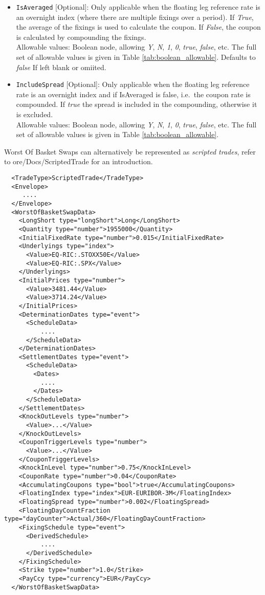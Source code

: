 \begin{itemize}
  \item \lstinline!IsAveraged! [Optional]: Only applicable when the floating leg
  reference rate is an overnight index (where there are multiple fixings over a period). If \emph{True},
  the average of the fixings is used to calculate the coupon. If \emph{False},
  the coupon is calculated by compounding the fixings. \\
    Allowable values: Boolean node, allowing \emph{Y}, \emph{N}, \emph{1}, \emph{0}, \emph{true},
    \emph{false}, etc. The full set of allowable values is given in Table \ref{tab:boolean_allowable}.
    Defaults to \emph{false} If left blank or omiited.
  \item \lstinline!IncludeSpread! [Optional]: Only applicable when the floating leg
  reference rate is an overnight index and if IsAveraged is false, i.e.\ the coupon rate is compounded.
  If \emph{true} the spread is included in the compounding, otherwise it is excluded. \\
     Allowable values:  Boolean node, allowing \emph{Y}, \emph{N}, \emph{1}, \emph{0}, \emph{true}, \emph{false}, etc.
  The full set of allowable values is given in Table \ref{tab:boolean_allowable}.
\end{itemize}

Worst Of Basket Swaps can alternatively be represented as {\em scripted trades}, refer to ore/Docs/ScriptedTrade for an introduction.

\begin{verbatim}
  <TradeType>ScriptedTrade</TradeType>
  <Envelope>
     ....
  </Envelope>
  <WorstOfBasketSwapData>
    <LongShort type="longShort">Long</LongShort>
    <Quantity type="number">1955000</Quantity>
    <InitialFixedRate type="number">0.015</InitialFixedRate>
    <Underlyings type="index">
      <Value>EQ-RIC:.STOXX50E</Value>
      <Value>EQ-RIC:.SPX</Value>
    </Underlyings>
    <InitialPrices type="number">
      <Value>3481.44</Value>
      <Value>3714.24</Value>
    </InitialPrices>
    <DeterminationDates type="event">
      <ScheduleData>
          ....
      </ScheduleData>
    </DeterminationDates>
    <SettlementDates type="event">
      <ScheduleData>
        <Dates>
          ....
        </Dates>
      </ScheduleData>
    </SettlementDates>
    <KnockOutLevels type="number">
      <Value>...</Value>
    </KnockOutLevels>
    <CouponTriggerLevels type="number">
      <Value>...</Value>
    </CouponTriggerLevels>
    <KnockInLevel type="number">0.75</KnockInLevel>
    <CouponRate type="number">0.04</CouponRate>
    <AccumulatingCoupons type="bool">true</AccumulatingCoupons>
    <FloatingIndex type="index">EUR-EURIBOR-3M</FloatingIndex>
    <FloatingSpread type="number">0.002</FloatingSpread>
    <FloatingDayCountFraction type="dayCounter">Actual/360</FloatingDayCountFraction>
    <FixingSchedule type="event">
      <DerivedSchedule>
          ....
      </DerivedSchedule>
    </FixingSchedule>
    <Strike type="number">1.0</Strike>
    <PayCcy type="currency">EUR</PayCcy>
  </WorstOfBasketSwapData>
\end{verbatim}

